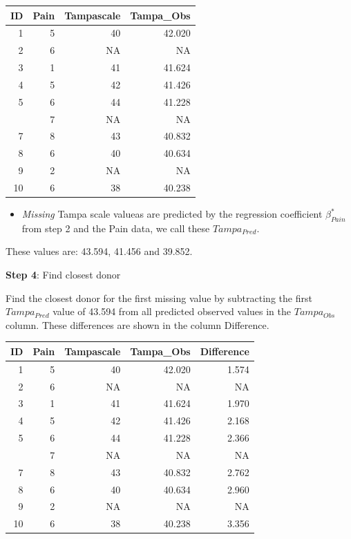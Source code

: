 \documentclass[]{book}
\providecommand{\tightlist}{%
  \setlength{\itemsep}{0pt}\setlength{\parskip}{0pt}}
\begin{document}
\begin{tabular}{rrrr}
\toprule
ID & Pain & Tampascale & Tampa\_Obs\\
\midrule
1 & 5 & 40 & 42.020\\
2 & 6 & NA & NA\\
3 & 1 & 41 & 41.624\\
4 & 5 & 42 & 41.426\\
5 & 6 & 44 & 41.228\\
\addlinespace
6 & 7 & NA & NA\\
7 & 8 & 43 & 40.832\\
8 & 6 & 40 & 40.634\\
9 & 2 & NA & NA\\
10 & 6 & 38 & 40.238\\
\bottomrule
\end{tabular}

\begin{itemize}
\tightlist
\item
  \emph{Missing} Tampa scale valueas are predicted by the regression
  coefficient \(\beta_{Pain}^*\) from step 2 and the Pain data, we call
  these \(Tampa_{Pred}\).
\end{itemize}

These values are: 43.594, 41.456 and 39.852.

\textbf{Step 4}: Find closest donor

Find the closest donor for the first missing value by subtracting the
first \(Tampa_{Pred}\) value of 43.594 from all predicted observed
values in the \(Tampa_{Obs}\) column. These differences are shown in the
column Difference.

\begin{tabular}{rrrrr}
\toprule
ID & Pain & Tampascale & Tampa\_Obs & Difference\\
\midrule
1 & 5 & 40 & 42.020 & 1.574\\
2 & 6 & NA & NA & NA\\
3 & 1 & 41 & 41.624 & 1.970\\
4 & 5 & 42 & 41.426 & 2.168\\
5 & 6 & 44 & 41.228 & 2.366\\
\addlinespace
6 & 7 & NA & NA & NA\\
7 & 8 & 43 & 40.832 & 2.762\\
8 & 6 & 40 & 40.634 & 2.960\\
9 & 2 & NA & NA & NA\\
10 & 6 & 38 & 40.238 & 3.356\\
\bottomrule
\end{tabular}
\end{document}
